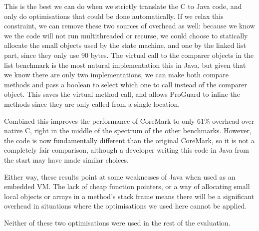 This is the best we can do when we strictly translate the C to Java code, and only do optimisations that could be done automatically. If we relax this constraint, we can remove these two sources of overhead as well: because we know we the code will not run multithreaded or recurse, we could choose to statically allocate the small objects used by the state machine, and one by the linked list part, since they only use 90 bytes. The virtual call to the comparer objects in the list benchmark is the most natural implementation this in Java, but given that we know there are only two implementations, we can make both compare methods  and pass a boolean to select which one to call instead of the comparer object. This saves the virtual method call, and allows ProGuard to inline the methods since they are only called from a single location.

Combined this improves the performance of CoreMark to only 61\% overhead over native C, right in the middle of the spectrum of the other benchmarks. However, the code is now fundamentally different than the original CoreMark, so it is not a completely fair comparison, although a developer writing this code in Java from the start may have made similar choices.

Either way, these results point at some weaknesses of Java when used as an embedded VM. The lack of cheap function pointers, or a way of allocating small local objects or arrays in a method's stack frame means there will be a significant overhead in situations where the optimisations we used here cannot be applied.

Neither of these two optimisations were used in the rest of the evaluation.


















